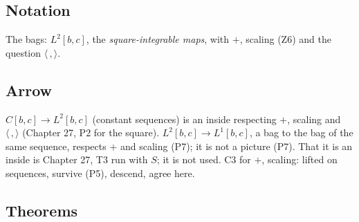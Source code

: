 \subsection*{Notation}

\begin{lines}
\item[\lab{N1}] The bags: $L^2[b,c]$, the \emph{square-integrable maps}, with $+$, scaling (Z6) and the question $\langle\,,\rangle$.
\end{lines}

\subsection*{Arrow}

\begin{lines}
\item[\lab{P8}] $C[b,c] \to L^2[b,c]$ (constant sequences) is an inside respecting $+$, scaling and $\langle\,,\rangle$ (Chapter 27, P2 for the square). $L^2[b,c] \to L^1[b,c]$, a bag to the bag of the same sequence, respects $+$ and scaling (P7); it is not a picture (P7). That it is an inside is Chapter 27, T3 run with $S$; it is not used. C3 for $+$, scaling: lifted on sequences, survive (P5), descend, agree here.
\end{lines}

\subsection*{Theorems}

